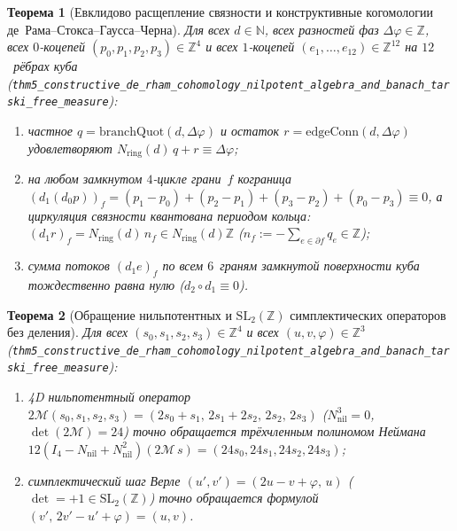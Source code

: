 \documentclass[11pt,a4paper]{article}
\theoremstyle{plain}
\newtheorem{theorem}{Теорема}[section]
\theoremstyle{definition}
\begin{document}
\begin{theorem}[Евклидово расщепление связности и конструктивные когомологии де~Рама--Стокса--Гаусса--Черна]
\label{thm:main-5}
Для всех $d\in\mathbb{N}$, всех разностей фаз $\Delta\varphi\in\mathbb{Z}$, всех $0$-коцепей $(p_0,p_1,p_2,p_3)\in\mathbb{Z}^4$ и всех $1$-коцепей $(e_1,\dots,e_{12})\in\mathbb{Z}^{12}$ на $12$~рёбрах куба (\texttt{thm5\_constructive\_de\_rham\_cohomology\_nilpotent\_algebra\_and\_banach\_tarski\_free\_measure}):
\begin{enumerate}[label=\textbf{(\roman*)},leftmargin=*,noitemsep]
\item частное $q = \mathrm{branchQuot}(d,\Delta\varphi)$ и остаток $r = \mathrm{edgeConn}(d,\Delta\varphi)$ удовлетворяют $N_{\mathrm{ring}}(d)\,q + r \equiv \Delta\varphi$;
\item на любом замкнутом $4$-цикле грани~$f$ кограница $(d_1(d_0 p))_f = (p_1-p_0)+(p_2-p_1)+(p_3-p_2)+(p_0-p_3) \equiv 0$, а циркуляция связности квантована периодом кольца: $(d_1 r)_f = N_{\mathrm{ring}}(d)\,n_f \in N_{\mathrm{ring}}(d)\mathbb{Z}$ ($n_f := -\sum_{e\in\partial f} q_e\in\mathbb{Z}$);
\item сумма потоков $(d_1 e)_f$ по всем $6$~граням замкнутой поверхности куба тождественно равна нулю ($d_2\circ d_1\equiv 0$).
\end{enumerate}
\end{theorem}

\begin{theorem}[Обращение нильпотентных и $\mathrm{SL}_2(\mathbb{Z})$ симплектических операторов без деления]
\label{thm:main-5b}
Для всех $(s_0,s_1,s_2,s_3)\in\mathbb{Z}^4$ и всех $(u,v,\varphi)\in\mathbb{Z}^3$ (\texttt{thm5\_constructive\_de\_rham\_cohomology\_nilpotent\_algebra\_and\_banach\_tarski\_free\_measure}):
\begin{enumerate}[label=\textbf{(\roman*)},leftmargin=*,noitemsep]
\item 4D нильпотентный оператор $2\mathcal{M}(s_0,s_1,s_2,s_3) = (2s_0+s_1,\,2s_1+2s_2,\,2s_2,\,2s_3)$ ($N_{\mathrm{nil}}^3 = 0$, $\det(2\mathcal{M})=24$) точно обращается трёхчленным полиномом Неймана $12(I_4 - N_{\mathrm{nil}} + N_{\mathrm{nil}}^2)(2\mathcal{M}\,s) = (24s_0,24s_1,24s_2,24s_3)$;
\item симплектический шаг Верле $(u',v') = (2u-v+\varphi,\,u)$ ($\det=+1\in\mathrm{SL}_2(\mathbb{Z})$) точно обращается формулой $(v',\,2v'-u'+\varphi) = (u,v)$.
\end{enumerate}
\end{theorem}
\end{document}
